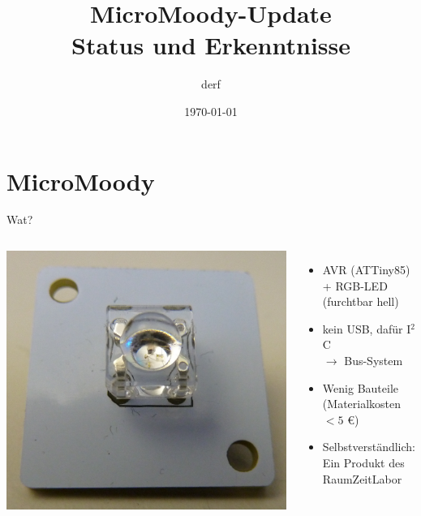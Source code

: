 \documentclass[compress]{beamer}
\title[MicroMoody]
	{MicroMoody-Update\\\small Status und Erkenntnisse}
\author{derf}
\institute{Chaosdorf}
\date{\today}
\begin{document}
\begin{frame}
	\titlepage
\end{frame}

\section{MicroMoody}
\begin{frame}{Wat?}
\begin{columns}
\includegraphics[width=\textwidth]{micromoody_front.jpg}
\begin{itemize}
\item<2-> AVR (ATTiny85) + RGB-LED\\
(furchtbar hell)
\item<3-> kein USB, dafür I$^2$C\\
$\to$ Bus-System
\item<4-> Wenig Bauteile\\
(Materialkosten $< 5$ \euro)
\item<5-> Selbstverständlich:\\
Ein Produkt des RaumZeitLabor
\end{itemize}
\end{columns}
\end{frame}
\end{document}
